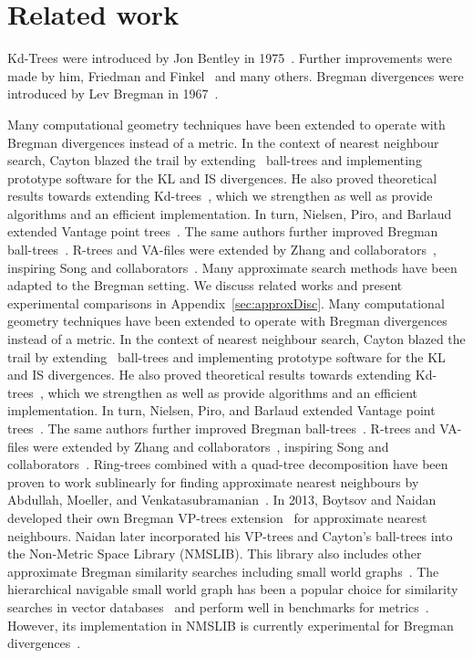 \section{Related work}
\label{sec:related}
Kd-Trees were introduced by Jon Bentley in 1975~\cite{Bentley1975MultidimensionalBS}. Further improvements were made by him, Friedman and Finkel~\cite{kd2_bentley} and many others. Bregman divergences were introduced by Lev Bregman in 1967~\cite{BREGMAN1967200}.

\ifapprox
    Many computational geometry techniques have been extended to operate with Bregman divergences instead of a metric. In the context of nearest neighbour search, Cayton blazed the trail by extending~\cite{CaytonBBTrees} ball-trees and implementing prototype software for the KL and IS divergences. He also proved theoretical results towards extending Kd-trees~\cite{caytonphd2009}, which we strengthen as well as provide algorithms and an efficient implementation. In turn, Nielsen, Piro, and Barlaud extended Vantage point trees~\cite{5202635, VPTree}. The same authors further improved Bregman ball-trees~\cite{Bregman_Ball_Trees, BBTreepp}. R-trees and VA-files were extended by Zhang and collaborators~\cite{RTreesVAFiles}, inspiring Song and collaborators~\cite{song2020brepartition}. Many approximate search methods have been adapted to the Bregman setting. We discuss related works and present experimental comparisons in Appendix~\ref{sec:approxDisc}.
\else
    Many computational geometry techniques have been extended to operate with Bregman divergences instead of a metric. In the context of nearest neighbour search, Cayton blazed the trail by extending~\cite{CaytonBBTrees} ball-trees and implementing prototype software for the KL and IS divergences. He also proved theoretical results towards extending Kd-trees~\cite{caytonphd2009}, which we strengthen as well as provide algorithms and an efficient implementation. In turn, Nielsen, Piro, and Barlaud extended Vantage point trees~\cite{5202635, VPTree}. The same authors further improved Bregman ball-trees~\cite{Bregman_Ball_Trees, BBTreeGithub}. R-trees and VA-files were extended by Zhang and collaborators~\cite{RTreesVAFiles}, inspiring Song and collaborators~\cite{song2020brepartition}. Ring-trees combined with a quad-tree decomposition have been proven to work sublinearly for finding approximate nearest neighbours by Abdullah, Moeller, and Venkatasubramanian~\cite{Bregman_ring_tree}. In 2013, Boytsov and Naidan developed their own Bregman VP-trees extension~\cite{BoytsovNaidan_VPTrees} for approximate nearest neighbours. Naidan later incorporated his VP-trees and Cayton's ball-trees into the Non-Metric Space Library (NMSLIB)\cite{nmslib}. This library also includes other approximate Bregman similarity searches including small world graphs~\cite{MalkovPonomarenkoLogvinovKrylov_SWG}. The hierarchical navigable small world graph has been a popular choice for similarity searches in vector databases~\cite{HNSW_Zilliz, HNSW_MariaDB, HNSW_MongoDB} and perform well in benchmarks for metrics~\cite{ANN_Benchmarks}. However, its implementation in NMSLIB is currently experimental for Bregman divergences~\cite{HNSW_Git}.
